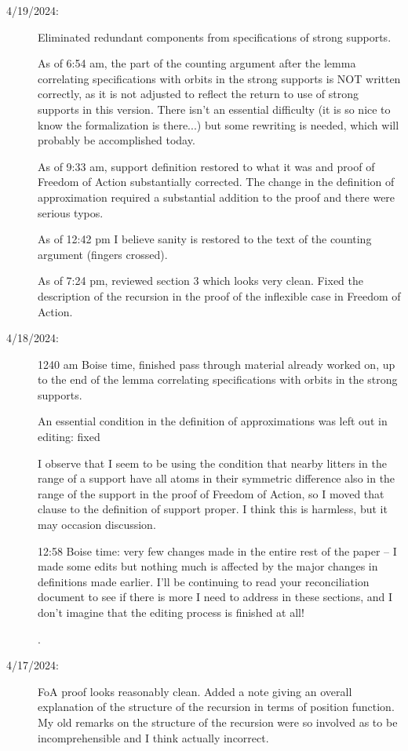 \documentclass[112pt]{article}
\begin{document}
\begin{description}
\item[4/19/2024:]  Eliminated redundant components from specifications of strong supports.

As of 6:54 am, the part of the counting argument after the lemma correlating specifications with orbits in the strong supports is NOT written correctly, as it is not adjusted to reflect the return to use of strong supports
in this version.  There isn't an essential difficulty (it is so nice to know the formalization is there...)  but some rewriting is needed, which will probably be accomplished today.

As of 9:33 am, support definition restored to what it was and proof of Freedom of Action substantially corrected.  The change in the definition of approximation required a substantial addition to the proof and there were serious typos.

As of 12:42 pm I believe sanity is restored to the text of the counting argument (fingers crossed).

As of 7:24 pm, reviewed section 3 which looks very clean.  Fixed the description of the recursion in the proof of the inflexible case in Freedom of Action.

\item[4/18/2024:]  1240 am Boise time, finished pass through material already worked on, up to the end of the lemma
correlating specifications with orbits in the strong supports.

An essential condition in the definition of approximations was left out in editing:  fixed

I observe that I seem to be using the condition that nearby litters in the range of a support have all atoms in their symmetric difference also in the range of the support in the proof of Freedom of Action, so I moved that clause to the definition of support proper.  I think this is harmless, but it may occasion discussion.

12:58 Boise time:  very few changes made in the entire rest of the paper -- I made some edits but nothing much is affected by the major changes in definitions made earlier.  I'll be continuing to read your reconciliation document to see if there is more I need to address in these sections, and I don't imagine that the editing process is finished at all!

.
\item[4/17/2024:]  FoA proof looks reasonably clean.  Added a note giving an overall explanation of the structure of the recursion in terms of position function.  My old remarks on the structure of the recursion were so involved as to be incomprehensible and I think actually incorrect.


\end{description}
\end{document}
